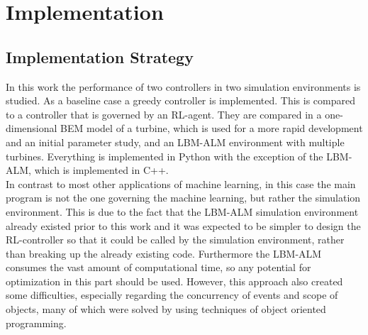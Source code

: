 \section{Implementation}
\subsection{Implementation Strategy}
In this work the performance of two controllers in two simulation environments is studied. As a baseline case a greedy controller is implemented. This is compared to a controller that is governed by an RL-agent. They are compared in a one-dimensional BEM model of a turbine, which is used for a more rapid development and an initial parameter study, and an LBM-ALM environment with multiple turbines. Everything is implemented in Python with the exception of the LBM-ALM, which is implemented in C++.\\
In contrast to most other applications of machine learning, in this case the main program is not the one governing the machine learning, but rather the simulation environment. This is due to the fact that the LBM-ALM simulation environment already existed prior to this work and it was expected to be simpler to design the RL-controller so that it could be called by the simulation environment, rather than breaking up the already existing code. Furthermore the LBM-ALM consumes the vast amount of computational time, so any potential for optimization in this part should be used. However, this approach also created some difficulties, especially regarding the concurrency of events and scope of objects, many of which were solved by using techniques of object oriented programming.
